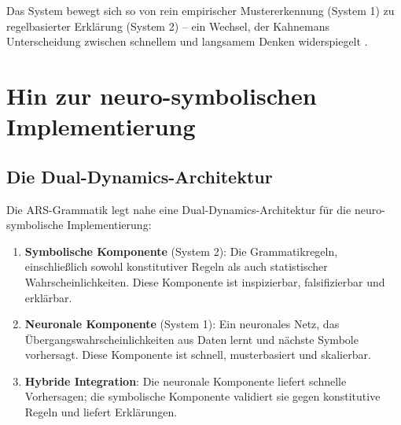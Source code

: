 \documentclass[12pt,a4paper]{article}
\begin{document}
Das System bewegt sich so von rein empirischer Mustererkennung (System 1)
zu regelbasierter Erklärung (System 2) – ein Wechsel, der Kahnemans
Unterscheidung zwischen schnellem und langsamem Denken widerspiegelt
\citep{kahneman2011thinking}.

\section{Hin zur neuro-symbolischen Implementierung}

\subsection{Die Dual-Dynamics-Architektur}

Die ARS-Grammatik legt nahe eine Dual-Dynamics-Architektur für die
neuro-symbolische Implementierung:

\begin{enumerate}
    \item \textbf{Symbolische Komponente} (System 2): Die Grammatikregeln,
    einschließlich sowohl konstitutiver Regeln als auch statistischer
    Wahrscheinlichkeiten. Diese Komponente ist inspizierbar, falsifizierbar
    und erklärbar.
    
    \item \textbf{Neuronale Komponente} (System 1): Ein neuronales Netz,
    das Übergangswahrscheinlichkeiten aus Daten lernt und nächste Symbole
    vorhersagt. Diese Komponente ist schnell, musterbasiert und skalierbar.
    
    \item \textbf{Hybride Integration}: Die neuronale Komponente liefert
    schnelle Vorhersagen; die symbolische Komponente validiert sie gegen
    konstitutive Regeln und liefert Erklärungen.
\end{enumerate}
\end{document}
